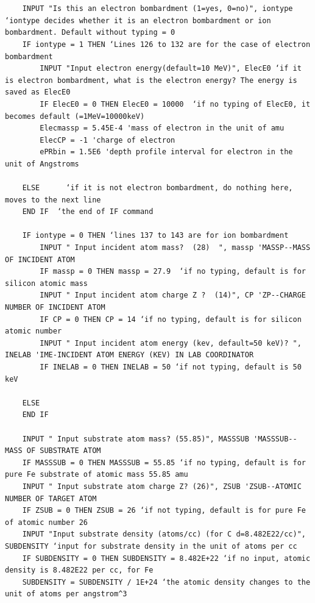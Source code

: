 \documentclass[10pt, reqno]{exam}
\begin{document}
\begin{verbatim}
    
    
    INPUT "Is this an electron bombardment (1=yes, 0=no)", iontype  ‘iontype decides whether it is an electron bombardment or ion bombardment. Default without typing = 0
    IF iontype = 1 THEN ‘Lines 126 to 132 are for the case of electron bombardment
        INPUT "Input electron energy(default=10 MeV)", ElecE0 ‘if it is electron bombardment, what is the electron energy? The energy is saved as ElecE0
        IF ElecE0 = 0 THEN ElecE0 = 10000  ‘if no typing of ElecE0, it becomes default (=1MeV=10000keV)
        Elecmassp = 5.45E-4 'mass of electron in the unit of amu
        ElecCP = -1 'charge of electron
        ePRbin = 1.5E6 'depth profile interval for electron in the unit of Angstroms
    
    ELSE      ‘if it is not electron bombardment, do nothing here, moves to the next line
    END IF  ‘the end of IF command 
    
    IF iontype = 0 THEN ‘lines 137 to 143 are for ion bombardment
        INPUT " Input incident atom mass?  (28)  ", massp 'MASSP--MASS OF INCIDENT ATOM
        IF massp = 0 THEN massp = 27.9  ‘if no typing, default is for silicon atomic mass
        INPUT " Input incident atom charge Z ?  (14)", CP 'ZP--CHARGE NUMBER OF INCIDENT ATOM
        IF CP = 0 THEN CP = 14 ‘if no typing, default is for silicon atomic number
        INPUT " Input incident atom energy (kev, default=50 keV)? ", INELAB 'IME-INCIDENT ATOM ENERGY (KEV) IN LAB COORDINATOR
        IF INELAB = 0 THEN INELAB = 50 ‘if not typing, default is 50 keV
    
    ELSE
    END IF
    
    INPUT " Input substrate atom mass? (55.85)", MASSSUB 'MASSSUB--MASS OF SUBSTRATE ATOM
    IF MASSSUB = 0 THEN MASSSUB = 55.85 ‘if no typing, default is for pure Fe substrate of atomic mass 55.85 amu
    INPUT " Input substrate atom charge Z? (26)", ZSUB 'ZSUB--ATOMIC NUMBER OF TARGET ATOM
    IF ZSUB = 0 THEN ZSUB = 26 ‘if not typing, default is for pure Fe of atomic number 26
    INPUT "Input substrate density (atoms/cc) (for C d=8.482E22/cc)", SUBDENSITY ‘input for substrate density in the unit of atoms per cc
    IF SUBDENSITY = 0 THEN SUBDENSITY = 8.482E+22 ‘if no input, atomic density is 8.482E22 per cc, for Fe
    SUBDENSITY = SUBDENSITY / 1E+24 ‘the atomic density changes to the unit of atoms per angstrom^3
    

\end{verbatim}
\end{document}

